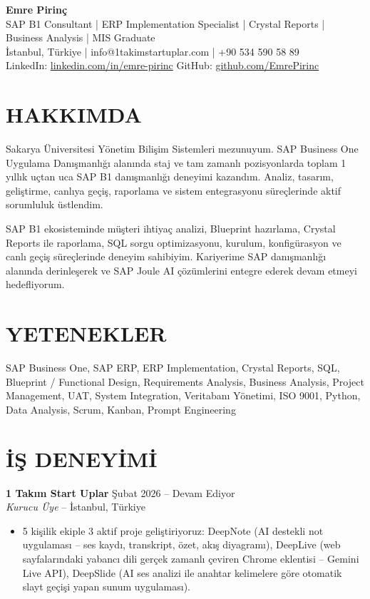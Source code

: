 \documentclass[a4paper,8pt]{article}
\begin{document}
\begin{center}
{\Large\bfseries Emre Pirinç}\\[2pt]
{\small SAP B1 Consultant | ERP Implementation Specialist | Crystal Reports | Business Analysis | MIS Graduate}\\[2pt]
{\small İstanbul, Türkiye | info@1takimstartuplar.com | +90 534 590 58 89}\\[1pt]
{\small LinkedIn: \href{https://linkedin.com/in/emre-pirinc}{linkedin.com/in/emre-pirinc} \textbar{} GitHub: \href{https://github.com/EmrePirinc}{github.com/EmrePirinc}}
\end{center}

\vspace{-2pt}

\section{HAKKIMDA}
{\small Sakarya Üniversitesi Yönetim Bilişim Sistemleri mezunuyum. SAP Business One Uygulama Danışmanlığı alanında staj ve tam zamanlı pozisyonlarda toplam 1 yıllık uçtan uca SAP B1 danışmanlığı deneyimi kazandım. Analiz, tasarım, geliştirme, canlıya geçiş, raporlama ve sistem entegrasyonu süreçlerinde aktif sorumluluk üstlendim.

SAP B1 ekosisteminde müşteri ihtiyaç analizi, Blueprint hazırlama, Crystal Reports ile raporlama, SQL sorgu optimizasyonu, kurulum, konfigürasyon ve canlı geçiş süreçlerinde deneyim sahibiyim. Kariyerime SAP danışmanlığı alanında derinleşerek ve SAP Joule AI çözümlerini entegre ederek devam etmeyi hedefliyorum.}

\section{YETENEKLER}
{\small SAP Business One, SAP ERP, ERP Implementation, Crystal Reports, SQL, Blueprint / Functional Design, Requirements Analysis, Business Analysis, Project Management, UAT, System Integration, Veritabanı Yönetimi, ISO 9001, Python, Data Analysis, Scrum, Kanban, Prompt Engineering}

\section{İŞ DENEYİMİ}

\textbf{1 Takım Start Uplar} \hfill {\small Şubat 2026 -- Devam Ediyor}\\
{\small \textit{Kurucu Üye} -- İstanbul, Türkiye}
\begin{itemize}
\item {\small 5 kişilik ekiple 3 aktif proje geliştiriyoruz: DeepNote (AI destekli not uygulaması -- ses kaydı, transkript, özet, akış diyagramı), DeepLive (web sayfalarındaki yabancı dili gerçek zamanlı çeviren Chrome eklentisi -- Gemini Live API), DeepSlide (AI ses analizi ile anahtar kelimelere göre otomatik slayt geçişi yapan sunum uygulaması).}
\end{itemize}
\end{document}
